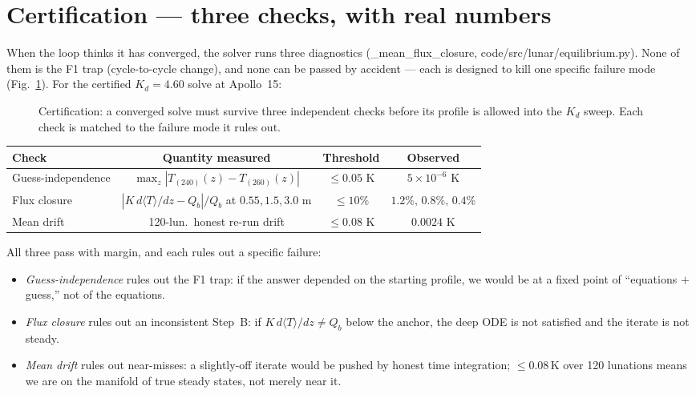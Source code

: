 \documentclass[11pt]{report}
\newcommand{\Tm}{\langle T\rangle}
\newcommand{\code}[1]{{\ttfamily\small #1}}
\begin{document}
\medskip
{}
\par\medskip

\section{Certification --- three checks, with real numbers}\label{sec:cert}

When the loop thinks it has converged, the solver runs three diagnostics
(\code{\_mean\_flux\_closure}, \code{code/src/lunar/equilibrium.py}). None of them
is the F1 trap (cycle-to-cycle change), and none can be passed by accident ---
each is designed to kill one specific failure mode
(Fig.~\ref{fig:certflow}). For the certified $K_d=4.60$ solve at Apollo~15:

\begin{figure}[htbp]\centering

\caption{Certification: a converged solve must survive three independent
checks before its profile is allowed into the $K_d$ sweep. Each check is
matched to the failure mode it rules out.}
\label{fig:certflow}
\end{figure}

\begin{center}\small
\begin{tabular}{@{}lccc@{}}
\toprule
Check & Quantity measured & Threshold & Observed \\
\midrule
Guess-independence & $\max_z|T_{(240)}(z)-T_{(260)}(z)|$  & $\le 0.05$ K   & $5\times10^{-6}$ K \\
Flux closure       & $|K\,d\Tm/dz - Q_b|/Q_b$ at $0.55,1.5,3.0$ m & $\le 10\%$ & $1.2\%,\,0.8\%,\,0.4\%$ \\
Mean drift         & 120-lun.\ honest re-run drift     & $\le 0.08$ K   & $0.0024$ K \\
\bottomrule
\end{tabular}
\end{center}

\noindent All three pass with margin, and each rules out a specific failure:
\begin{itemize}[leftmargin=1.4em,itemsep=2pt]
\item \emph{Guess-independence} rules out the F1 trap: if the answer depended on
  the starting profile, we would be at a fixed point of ``equations $+$ guess,''
  not of the equations.
\item \emph{Flux closure} rules out an inconsistent Step~B: if $K\,d\Tm/dz\ne
  Q_b$ below the anchor, the deep ODE is not satisfied and the iterate is not
  steady.
\item \emph{Mean drift} rules out near-misses: a slightly-off iterate would be
  pushed by honest time integration; $\le0.08$\,K over 120 lunations means we are
  on the manifold of true steady states, not merely near it.
\end{itemize}
\end{document}

